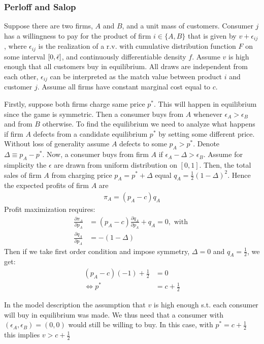 \documentclass[11pt]{article}
\numberwithin{equation}{section}
\newcommand{\1}[1]{\,I_{#1}} %
\begin{document}
\subsubsection{Perloff and Salop}
Suppose there are two firms, $A$ and $B$, and a unit mass of customers. Consumer $j$ has a
willingness to pay for the product of firm $i\in\{A,B\}$ that is given by $v+\epsilon_{ij}$,
where $\epsilon_{ij}$ is the realization of a r.v. with cumulative distribution function $F$ on
some interval $[0,\Bar{\epsilon}]$, and continuously differentiable density $f$. Assume $v$ is
high enough that all customers buy in equilibrium. All draws are independent from each other,
$\epsilon_{ij}$ can be interpreted as the match value between product $i$ and customer $j$.
Assume all firms have constant marginal cost equal to $c$.

Firstly, suppose both firms charge same price $p^*$. This will happen in equilibrium since the
game is symmetric. Then a consumer buys from $A$ whenever $\epsilon_A>\epsilon_B$ and from $B$
otherwise. To find the equilibrium we need to analyze what happens if firm $A$ defects from a
candidate equilibrium $p^*$ by setting some different price. Without loss of generality assume $A$
defects to some $p_A>p^*$. Denote $\Delta\equiv p_A-p^*$. Now, a consumer buys from firm $A$ if
$\epsilon_A-\Delta>\epsilon_B$. Assume for simplicity the $\epsilon$ are drawn from uniform
distribution on $[0,1]$. Then, the total sales of firm $A$ from charging price
$p_A=p^*+\Delta$ equal $q_A=\frac{1}{2}(1-\Delta)^2$. Hence the expected profits of firm $A$ are
\begin{align}
	\pi_A=(p_A-c)q_A
\end{align}
Profit maximization requires:
\begin{align}
	\frac{\partial\pi_A}{\partial p_A} & =(p_A-c)\frac{\partial q_A}{\partial p_A}+q_A=0,
	\text{ with }\label{eq:FOC_perloff_salop}                                             \\
	\frac{\partial q_A}{\partial p_A}  & =-(1-\Delta)
\end{align}
Then if we take first order condition and impose symmetry, $\Delta=0$ and $q_A=\frac{1}{2}$, we get:
\begin{align}
	(p_A-c)(-1)+\frac{1}{2} & =0             \\
	\Longleftrightarrow p^* & =c+\frac{1}{2}
\end{align}

In the model description the assumption that $v$ is high enough s.t. each consumer will buy in
equilibrium was made. We thus need that a consumer with $(\epsilon_A,\epsilon_B)=(0,0)$ would still
be willing to buy. In this case, with $p^*=c+\frac{1}{2}$ this implies $v>c+ \frac{1}{2}$
\end{document}
